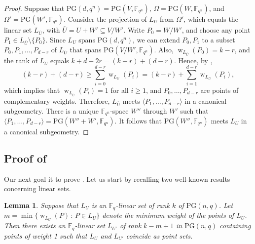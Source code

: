 \documentclass[11pt]{article}
\newtheorem{lemma}[theorem]{Lemma}
\theoremstyle{definition}
\newcommand{\fqn}{\mathbb{F}_{q^n}}
\newcommand{\fq}{{\mathbb F}_{q}}
\newcommand{\PG}{\mathrm{PG}}
\newcommand{\pg}{\PG}
\DeclareMathOperator{\ww}{w}
\begin{document}
\begin{proof}
Suppose that $\PG(d,q^n) = \PG(V,\fqn)$, $\Omega = \PG(W,\fqn)$, and $\Omega' = \PG(W',\fqn)$.
Consider the projection of $L_U$ from $\Omega'$, which equals the linear set $L_{\overline U}$, with $\overline U = U + W' \subseteq V / W'$.
Write $P_0 = W/W'$, and choose any point $P_1 \in L_{\overline U} \setminus \{ P_0 \}$.
Since $L_U$ spans $\PG(d,q^n)$, we can extend $P_0,P_1$ to a subset $P_0, P_1, \dots, P_{d-r}$ of $L_{\overline U}$ that spans $\PG(V/W',\fqn)$.
Also, $\ww_{L_{\overline U}}(P_0) = k-r$, and the rank of $L_{\overline U}$ equals $k + d - 2r = (k-r) + (d-r)$.
Hence, by ,
\[
 (k-r) + (d-r) \geq \sum_{i=0}^{d-r} \ww_{L_{\overline U}}(P_i)
 = (k-r) + \sum_{i=1}^{d-r} \ww_{L_{\overline U}}(P_i),
\]
which implies that $\ww_{L_{\overline U}}(P_i) = 1$ for all $i \geq 1$, and $P_0, \ldots, P_{d-r}$ are points of complementary weights.
Therefore, $L_{\overline U}$ meets $\langle P_1, \ldots, P_{d-r} \rangle$ in a canonical subgeometry.
There is a unique $\fqn$-space $W''$ through $W'$ such that $\langle P_1, \ldots, P_{d-r} \rangle = \pg(W'' + W', \fqn)$.
It follows that $\pg(W'',\fqn)$ meets $L_U$ in a canonical subgeometry.
\end{proof}


\subsection{Proof of \texorpdfstring{}{Theorem 1.6}}

Our next goal it to prove .
Let us start by recalling two well-known results concerning linear sets.

\begin{lemma}
 \label{Lm:PointOfWeight1}
 Suppose that $L_U$ is an $\fq$-linear set of rank $k$ of $\pg(n,q)$.
 Let $m = \min \{ \ww_{L_U}(P) \, : \, P \in L_U \}$ denote the minimum weight of the points of $L_U$.
 Then there exists an $\fq$-linear set $L_{U'}$ of rank $k-m+1$ in $\pg(n,q)$ containing points of weight 1 such that $L_U$ and $L_{U'}$ coincide as point sets.
\end{lemma}
\end{document}
